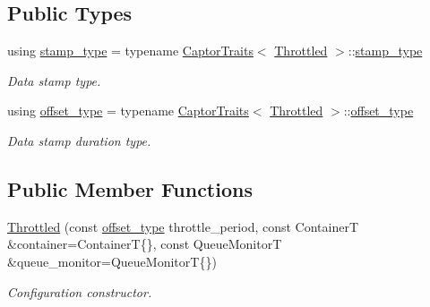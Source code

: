 \subsection*{Public Types}
\begin{DoxyCompactItemize}
\item 
\mbox{\label{classflow_1_1driver_1_1_throttled_ad85cd0e20eecbab225d7304da6152c0d}} 
using \hyperlink{classflow_1_1driver_1_1_throttled_ad85cd0e20eecbab225d7304da6152c0d}{stamp\+\_\+type} = typename \hyperlink{structflow_1_1_captor_traits}{Captor\+Traits}$<$ \hyperlink{classflow_1_1driver_1_1_throttled}{Throttled} $>$\+::\hyperlink{classflow_1_1driver_1_1_throttled_ad85cd0e20eecbab225d7304da6152c0d}{stamp\+\_\+type}
\begin{DoxyCompactList}\small\item\em Data stamp type. \end{DoxyCompactList}\item 
\mbox{\label{classflow_1_1driver_1_1_throttled_abceda047ac43fa03ddfe00b68317ae3d}} 
using \hyperlink{classflow_1_1driver_1_1_throttled_abceda047ac43fa03ddfe00b68317ae3d}{offset\+\_\+type} = typename \hyperlink{structflow_1_1_captor_traits}{Captor\+Traits}$<$ \hyperlink{classflow_1_1driver_1_1_throttled}{Throttled} $>$\+::\hyperlink{classflow_1_1driver_1_1_throttled_abceda047ac43fa03ddfe00b68317ae3d}{offset\+\_\+type}
\begin{DoxyCompactList}\small\item\em Data stamp duration type. \end{DoxyCompactList}\end{DoxyCompactItemize}
\subsection*{Public Member Functions}
\begin{DoxyCompactItemize}
\item 
\hyperlink{classflow_1_1driver_1_1_throttled_a745fa3afaa8aa8ffdf6f5b6efa49a4e2}{Throttled} (const \hyperlink{classflow_1_1driver_1_1_throttled_abceda047ac43fa03ddfe00b68317ae3d}{offset\+\_\+type} throttle\+\_\+period, const ContainerT \&container=ContainerT\{\}, const Queue\+MonitorT \&queue\+\_\+monitor=Queue\+MonitorT\{\})
\begin{DoxyCompactList}\small\item\em Configuration constructor. \end{DoxyCompactList}\end{DoxyCompactItemize}

